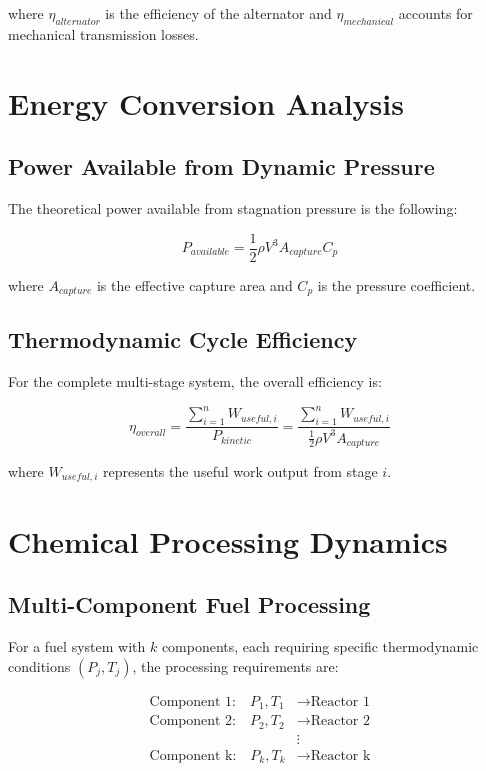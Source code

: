 \documentclass[12pt,a4paper]{article}
\begin{document}
where $\eta_{alternator}$ is the efficiency of the alternator and $\eta_{mechanical}$ accounts for mechanical transmission losses.

\section{Energy Conversion Analysis}

\subsection{Power Available from Dynamic Pressure}

The theoretical power available from stagnation pressure is the following:

\begin{equation}
P_{available} = \frac{1}{2}\rho V^3 A_{capture} C_p
\end{equation}

where $A_{capture}$ is the effective capture area and $C_p$ is the pressure coefficient.

\subsection{Thermodynamic Cycle Efficiency}

For the complete multi-stage system, the overall efficiency is:

\begin{equation}
\eta_{overall} = \frac{\sum_{i=1}^{n} W_{useful,i}}{P_{kinetic}} = \frac{\sum_{i=1}^{n} W_{useful,i}}{\frac{1}{2}\rho V^3 A_{capture}}
\end{equation}

where $W_{useful,i}$ represents the useful work output from stage $i$.

\section{Chemical Processing Dynamics}

\subsection{Multi-Component Fuel Processing}

For a fuel system with $k$ components, each requiring specific thermodynamic conditions $(P_j, T_j)$, the processing requirements are:

\begin{align}
\text{Component 1:} \quad P_1, T_1 &\rightarrow \text{Reactor 1} \\
\text{Component 2:} \quad P_2, T_2 &\rightarrow \text{Reactor 2} \\
&\vdots \\
\text{Component k:} \quad P_k, T_k &\rightarrow \text{Reactor k}
\end{align}
\end{document}
